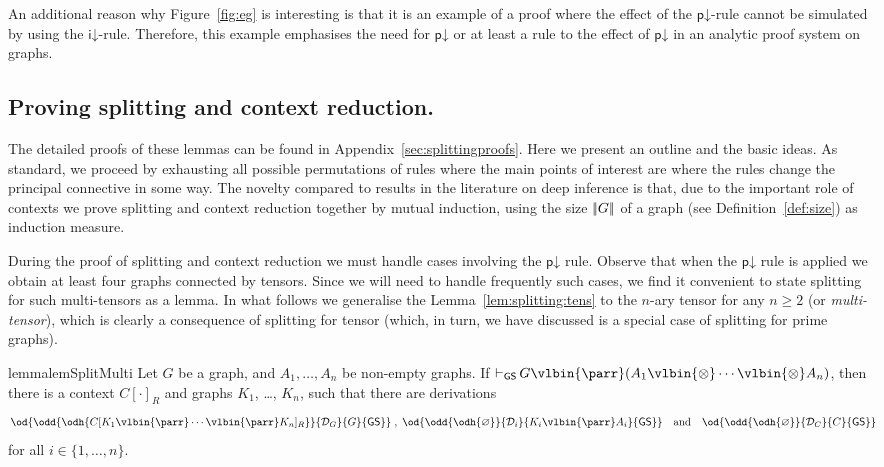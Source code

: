 \documentclass{lmcs} %
\newcommand{\proves}[2][]{\mathord{\vdash_{#1}\,}{#2}}
\renewcommand{\emptyset}{\varnothing}
\def\unit{\emptyset}
\def\GS{\mathsf{GS}}
\newcommand{\coons}[2]{[#1]_{#2}}														%
\newcommand{\coonso}[1]{[\cdot]_{#1}}
\newcommand{\quand}{\quad\mbox{and}\quad}
\newcommand{\qomma}{\;,\;}
\def\idr{\dirule}
\def\pdr{\dprule}
\def\ods#1#2#3#4{\od{\odd{\odh{#1}}{#2}{#3}{#4}}}
\def\set#1{\{#1\}}
\def\lpar{\vlbin{\parr}}
\def\ltens{\vlbin{\otimes}}
\def\irule{\mathsf{i}}
\def\dirule{\irule\mathord{\downarrow}}
\def\prule{\mathsf{p}}
\def\dprule{\prule\mathord{\downarrow}}
\def\gA{A}
\def\gC{C}
\def\gG{G}
\def\gK{K}
\newcommand{\dD}{\mathcal{D}}
\def\gsize#1{|\mkern-2.75mu|#1|\mkern-2.75mu|}
\theoremstyle{plain}
\begin{document}
An additional reason why Figure~\ref{fig:eg} is interesting is that it is an example of a proof where the effect of the $\pdr$-rule cannot be simulated by using the $\idr$-rule.
Therefore, this example emphasises the need for $\pdr$ or at least a rule to the effect of $\pdr$ in an analytic proof system on graphs.





\subsection*{Proving splitting and context reduction.}\label{sec:splitproofs-prime}

The detailed proofs of these lemmas can be found in Appendix~\ref{sec:splittingproofs}. Here we present an outline and the basic ideas.
As standard, we proceed by exhausting all possible permutations of rules where the main points of interest are where the rules change the principal connective in some way.
The novelty compared to results in the literature on deep inference is that, due to the important role of contexts we prove splitting and context reduction together by  mutual induction, using the size $\gsize{\gG}$ of a graph (see Definition~\ref{def:size}) as induction measure.

During the proof of splitting and context reduction we must handle cases involving the $\pdr$ rule. 
Observe that when the $\pdr$ rule is applied we obtain at least four graphs connected by tensors.
Since we will need to handle frequently such cases, we find it convenient to state splitting for such multi-tensors as a lemma.
In what follows we generalise the Lemma~\ref{lem:splitting:tens} to the $n$-ary tensor for any $n\geq 2$ (or \emph{multi-tensor}), which is clearly a consequence of splitting for tensor (which, in turn, we have discussed is a special case of splitting for prime graphs).



\begin{restatable}{lemma}{lemSplitMulti}\label{lem:splitting:multitens}
	Let $\gG$ be a graph,  and $\gA_1,\dots, \gA_n$ be non-empty graphs.
	If $\proves[\GS]{\gG\lpar ({\gA_1\ltens \cdots \ltens \gA_n})}$, 
	then there is a context $\gC\coonso R$ and graphs $\gK_1$, \dots , $\gK_n$, 
	such that  
	there are derivations
	\begin{equation*}
		\ods{\gC\coons{{\gK_1\lpar \cdots\lpar \gK_n}}R}{\dD_\gG}{\gG}{\GS}
		\qomma
		\ods{\unit}{\dD_i}{\gK_i\lpar\gA_i}{\GS}
		\quand
		\ods{\unit}{\dD_C}{\gC}{\GS}
		\hskip-1em
	\end{equation*}
	for all $i\in\set{1,\ldots,n}$.
\end{restatable}
\end{document}
